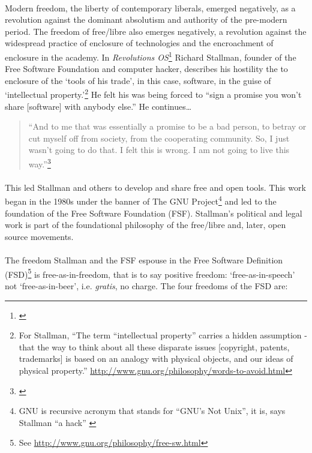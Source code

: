 \documentclass[11pt,titlepage]{book}
\begin{document}
\paragraph{}Modern freedom, the liberty of contemporary liberals, emerged negatively, as a revolution against the dominant absolutism and authority of the pre-modern period. The freedom of free/libre also emerges negatively, a revolution against the widespread practice of enclosure of technologies and the encroachment of enclosure in the academy. In \textit{Revolutions OS}\footnote{\cite{moore:2002rv}} Richard Stallman, founder of the Free Software Foundation and computer hacker, describes his hostility the to enclosure of the `tools of his trade', in this case, software, in the guise of `intellectual property.'\footnote{For Stallman, ``The term “intellectual property” carries a hidden assumption - that the way to think about all these disparate issues [copyright, patents, trademarks] is based on an analogy with physical objects, and our ideas of physical property.'' \url{http://www.gnu.org/philosophy/words-to-avoid.html}} He felt his was being forced to ``sign a promise you won't share [software] with anybody else.'' He continues\ldots

\begin{quote}``And to me that was essentially a promise to be a bad person, to betray or cut myself off from society, from the cooperating community. So, I just wasn't going to do that. I felt this is wrong. I am not going to live this way.''\footnote{\cite[9m55sec]{moore:2002rv}}
\end{quote}

\paragraph{}This led Stallman and others to develop and share free and open tools. This work began in the 1980s under the banner of The GNU Project\footnote{GNU is recursive acronym that stands for ``GNU's Not Unix'', it is, says Stallman ``a hack'' \cite[11m35sec]{moore:2002rv}} and led to the foundation of the Free Software Foundation (FSF).  Stallman's political and legal work is part of the foundational philosophy of the free/libre and, later, open source movements.

\paragraph{}The freedom Stallman and the FSF espouse in the Free Software Definition (FSD)\footnote{See \url{http://www.gnu.org/philosophy/free-sw.html}} is free-as-in-freedom, that is to say positive freedom: `free-as-in-speech' not `free-as-in-beer', i.e. \textit{gratis}, no charge. The four freedoms of the FSD are:
\end{document}
